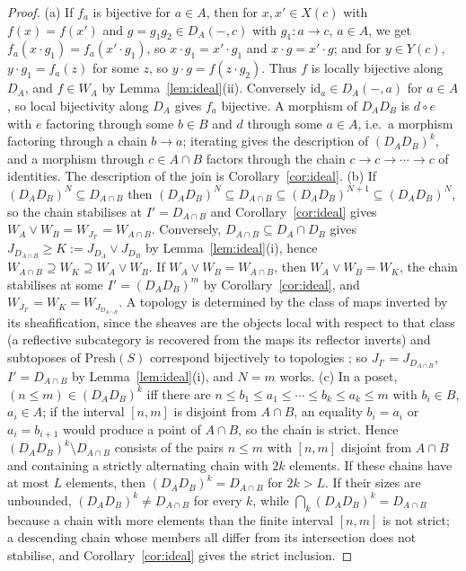 \documentclass[11pt]{amsart}
\theoremstyle{definition}
\newcommand{\Presh}{\mathrm{Presh}}
\begin{document}
\begin{proof}
(a) If $f_a$ is bijective for $a\in A$, then for $x,x'\in X(c)$ with
$f(x)=f(x')$ and $g=g_1g_2\in D_A(-,c)$ with $g_1\colon a\to c$, $a\in A$, we
get $f_a(x\cdot g_1)=f_a(x'\cdot g_1)$, so $x\cdot g_1=x'\cdot g_1$ and
$x\cdot g=x'\cdot g$; and for $y\in Y(c)$, $y\cdot g_1=f_a(z)$ for some $z$,
so $y\cdot g=f(z\cdot g_2)$. Thus $f$ is locally bijective along $D_A$, and
$f\in W_A$ by Lemma~\ref{lem:ideal}(ii). Conversely $\mathrm{id}_a\in
D_A(-,a)$ for $a\in A$, so local bijectivity along $D_A$ gives $f_a$
bijective. A morphism of $D_AD_B$ is $d\circ e$ with $e$ factoring through
some $b\in B$ and $d$ through some $a\in A$, i.e.\ a morphism factoring
through a chain $b\to a$; iterating gives the description of $(D_AD_B)^k$,
and a morphism through $c\in A\cap B$ factors through the chain
$c\to c\to\cdots\to c$ of identities. The description of the join is
Corollary~\ref{cor:ideal}.
(b) If $(D_AD_B)^N\subseteq D_{A\cap B}$ then
$(D_AD_B)^N\subseteq D_{A\cap B}\subseteq(D_AD_B)^{N+1}\subseteq(D_AD_B)^N$,
so the chain stabilises at $I'=D_{A\cap B}$ and Corollary~\ref{cor:ideal}
gives $W_A\vee W_B=W_{J_{I'}}=W_{A\cap B}$. Conversely, $D_{A\cap B}\subseteq
D_A\cap D_B$ gives $J_{D_{A\cap B}}\ge K:=J_{D_A}\vee J_{D_B}$ by
Lemma~\ref{lem:ideal}(i), hence $W_{A\cap B}\supseteq W_K\supseteq
W_A\vee W_B$. If $W_A\vee W_B=W_{A\cap B}$, then $W_A\vee W_B=W_K$, the chain
stabilises at some $I'=(D_AD_B)^m$ by Corollary~\ref{cor:ideal}, and
$W_{J_{I'}}=W_K=W_{J_{D_{A\cap B}}}$. A topology is determined by the class
of maps inverted by its sheafification, since the sheaves are the objects
local with respect to that class (a reflective subcategory is recovered from
the maps its reflector inverts) and subtoposes of $\Presh(S)$ correspond
bijectively to topologies \cite[Chap.~V]{MLM}; so $J_{I'}=J_{D_{A\cap B}}$,
$I'=D_{A\cap B}$ by Lemma~\ref{lem:ideal}(i), and $N=m$ works.
(c) In a poset, $(n\le m)\in(D_AD_B)^k$ iff there are $n\le b_1\le a_1\le
\cdots\le b_k\le a_k\le m$ with $b_i\in B$, $a_i\in A$; if the interval
$[n,m]$ is disjoint from $A\cap B$, an equality $b_i=a_i$ or $a_i=b_{i+1}$
would produce a point of $A\cap B$, so the chain is strict. Hence
$(D_AD_B)^k\setminus D_{A\cap B}$ consists of the pairs $n\le m$ with $[n,m]$
disjoint from $A\cap B$ and containing a strictly alternating chain with
$2k$ elements. If these chains have at most $L$ elements, then
$(D_AD_B)^k=D_{A\cap B}$ for $2k>L$. If their sizes are unbounded,
$(D_AD_B)^k\ne D_{A\cap B}$ for every $k$, while $\bigcap_k(D_AD_B)^k=
D_{A\cap B}$ because a chain with more elements than the finite interval
$[n,m]$ is not strict; a descending chain whose members all differ from its
intersection does not stabilise, and Corollary~\ref{cor:ideal} gives the
strict inclusion.
\end{proof}
\end{document}
